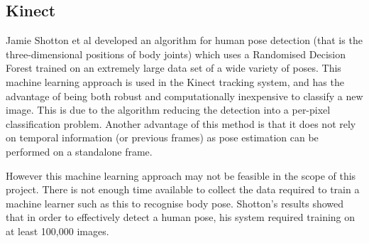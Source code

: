 \subsection{Kinect}

Jamie Shotton et al developed an algorithm\cite{shottonkinect} for human pose detection (that is the three-dimensional positions of body joints) which uses a Randomised Decision Forest trained on an extremely large data set of a wide variety of poses. This machine learning approach is used in the Kinect tracking system, and has the advantage of being both robust and computationally inexpensive to classify a new image. This is due to the algorithm reducing the detection into a per-pixel classification problem. Another advantage of this method is that it does not rely on temporal information (or previous frames) as pose estimation can be performed on a standalone frame.

However this machine learning approach may not be feasible in the scope of this project. There is not enough time available to collect the data required to train a machine learner such as this to recognise body pose. Shotton's results showed that in order to effectively detect a human pose, his system required training on at least 100,000 images\cite{shottonkinect}.